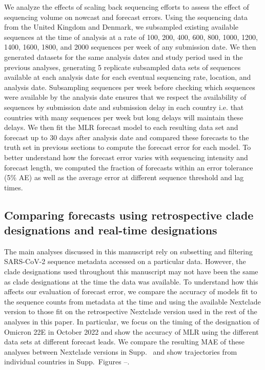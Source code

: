 \documentclass[10pt,letterpaper]{article}
\begin{document}
We analyze the effects of scaling back sequencing efforts to assess the effect of sequencing volume on nowcast and forecast errors.
Using the sequencing data from the United Kingdom and Denmark, we subsampled existing available sequences at the time of analysis at a rate of 100, 200, 400, 600, 800, 1000, 1200, 1400, 1600, 1800, and 2000 sequences per week of any submission date.
We then generated datasets for the same analysis dates and study period used in the previous analyses, generating 5 replicate subsampled data sets of sequences available at each analysis date for each eventual sequencing rate, location, and analysis date.
Subsampling sequences per week before checking which sequences were available by the analysis date ensures that we respect the availability of sequences by submission date and submission delay in each country i.e. that countries with many sequences per week but long delays will maintain these delays.
We then fit the MLR forecast model to each resulting data set and forecast up to 30 days after analysis date and compared these forecasts to the truth set in previous sections to compute the forecast error for each model.
To better understand how the forecast error varies with sequencing intensity and forecast length, we computed the fraction of forecasts within an error tolerance (5\% AE) as well as the average error at different sequence threshold and lag times.

\subsection*{Comparing forecasts using retrospective clade designations and real-time designations}

The main analyses discussed in this manuscript rely on subsetting and filtering SARS-CoV-2 sequence metadata accessed on a particular data.
However, the clade designations used throughout this manuscript may not have been the same as clade designations at the time the data was available.
To understand how this affects our evaluation of forecast error, we compare the accuracy of models fit to the sequence counts from metadata at the time and using the available Nextclade version to those fit on the retrospective Nextclade version used in the rest of the analyses in this paper.
In particular, we focus on the timing of the designation of Omicron 22E in October 2022 and show the accuracy of MLR using the different data sets at different forecast leads.
We compare the resulting MAE of these analyses between Nextclade versions in Supp.\   and show trajectories from individual countries in Supp.\ Figures --.
\end{document}
